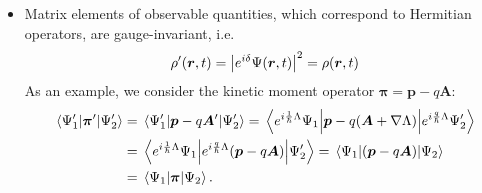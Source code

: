 \documentclass[11pt, a4paper]{article}
\renewcommand{\grad}{\nabla}
\newcommand{\Herm}{Hermitian\xspace}
\renewcommand{\vec}[1]{\bm{#1}}  %
\renewcommand{\r}{\vec{r}}  %
\newcommand{\A}{\vec{A}}  %
\renewcommand{\P}{\Psi}  %
\begin{document}
\begin{itemize}
	\item Matrix elements of observable quantities, which correspond to \Herm operators, are gauge-invariant, i.e.
	\begin{equation*}
		\rho'(\r, t) = \abs{e^{i\delta}\P(\r, t)}^{2} = \rho(\r, t)
	\end{equation*}
    As an example, we consider the kinetic moment operator $ \vec{\pi} = \vec{p} - q\A $:
	\begin{align*}
		\mel{\P_{1}'}{\vec{\pi}'}{\P_{2}'} & = \mel{\P_{1}'}{\vec{p} - q\A'}{\P_{2}'} = \mel{e^{i\frac{1}{\hbar}\Lambda}\P_{1}}{\vec{p} - q(\A + \grad \Lambda)}{e^{i\frac{q}{\hbar}\Lambda}\P_{2}'}\\
		& =  \mel{e^{i\frac{1}{\hbar}\Lambda}\P_{1}}{e^{i\frac{q}{\hbar}\Lambda}(\vec{p} - q \A)}{\P_{2}'} = \mel{\P_{1}}{(\vec{p} - q\A)}{\P_{2}}\\
		& = \mel{\P_{1}}{\vec{\pi}}{\P_{2}}.
	\end{align*}
\end{itemize}
\end{document}
